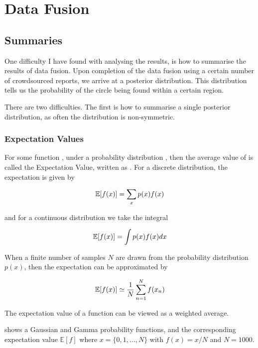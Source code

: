 \chapter{Data Fusion} \label{Chapter: DataFusion}

\section{Summaries}

One difficulty I have found with analysing the results, is how to summarise the results of data fusion. Upon completion of the data fusion using a certain number of crowdsourced reports, we arrive at a posterior distribution. This distribution tells us the probability of the circle being found within a certain region. 

There are two difficulties. The first is how to summarise a single posterior distribution, as often the distribution is non-symmetric. 

\subsection{Expectation Values}

For some function \funcx, under a probability distribution \probx, then the average value of \funcx is called the Expectation Value, written as \expectation{\funcx}. For a discrete distribution, the expectation is given by

\begin{equation}\label{Equation: discrete_expectation}
\mathbb{E}[f(x)]=\sum\limits_x p(x)f(x)
\end{equation}

and for a continuous distribution we take the integral

\begin{equation}\label{•}
\mathbb{E}[f(x)]=\int p(x)f(x) dx
\end{equation}

When a finite number of samples $N$ are drawn from the probability distribution $p(x)$, then the expectation can be approximated by 

\begin{equation}\label{Equation: discrete_sample_expectation}
\mathbb{E}[f(x)]\simeq\frac{1}{N}\sum\limits_{n=1}^N f(x_n)
\end{equation}

The expectation value of a function can be viewed as a weighted average.

 shows a Gaussian and Gamma probability functions, and the corresponding expectation value $\mathbb{E}[f]$ where $x=\lbrace0,1,...,N\rbrace$ with $f(x)=x/N$ and $N=1000$. 

